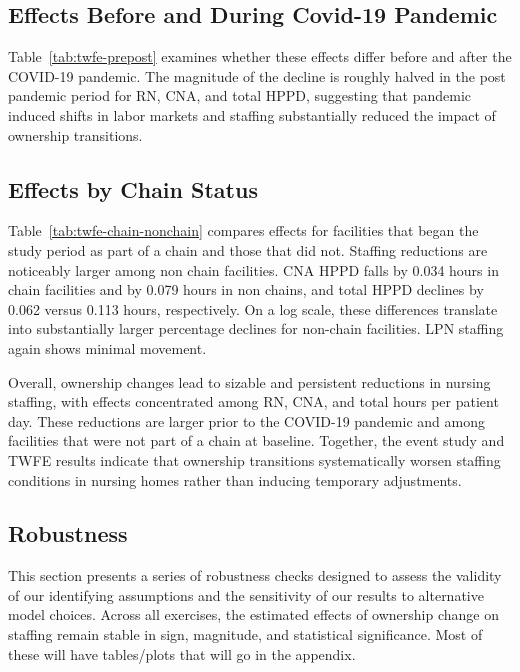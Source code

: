 \documentclass[preprint,authoryear]{elsarticle}
\begin{document}

\FloatBarrier

\subsection{Effects Before and During Covid-19 Pandemic}

Table~\ref{tab:twfe-prepost} examines whether these effects differ before and after the COVID-19 pandemic. The magnitude of the decline is roughly halved in the post pandemic period for RN, CNA, and total HPPD, suggesting that pandemic induced shifts in labor markets and staffing substantially reduced the impact of ownership transitions.


\FloatBarrier

\subsection{Effects by Chain Status}

Table~\ref{tab:twfe-chain-nonchain} compares effects for facilities that began the study period as part of a chain and those that did not. Staffing reductions are noticeably larger among non chain facilities. CNA HPPD falls by 0.034 hours in chain facilities and by 0.079 hours in non chains, and total HPPD declines by 0.062 versus 0.113 hours, respectively. On a log scale, these differences translate into substantially larger percentage declines for non-chain facilities. LPN staffing again shows minimal movement.


\FloatBarrier

Overall, ownership changes lead to sizable and persistent reductions in nursing staffing, with effects concentrated among RN, CNA, and total hours per patient day. These reductions are larger prior to the COVID-19 pandemic and among facilities that were not part of a chain at baseline. Together, the event study and TWFE results indicate that ownership transitions systematically worsen staffing conditions in nursing homes rather than inducing temporary adjustments.

\subsection{Robustness}

This section presents a series of robustness checks designed to assess the validity of our identifying assumptions and the sensitivity of our results to alternative model choices. Across all exercises, the estimated effects of ownership change on staffing remain stable in sign, magnitude, and statistical significance. Most of these will have tables/plots that will go in the appendix.
\end{document}
